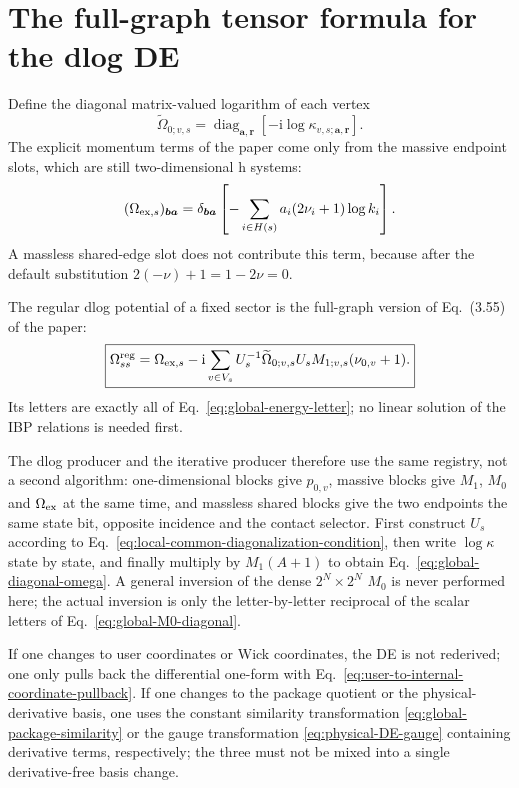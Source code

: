 \documentclass[11pt,a4paper]{article}
\newcommand{\ii}{\mathrm i}
\begin{document}
\section{The full-graph tensor formula for the dlog DE}

Define the diagonal matrix-valued logarithm of each vertex
\begin{equation}
 \widetilde\Omega_{0;v,s}
 =\operatorname{diag}_{\bm a,\bm r}
 \left[-\ii\log\kappa_{v,s;\bm a,\bm r}\right].
 \label{eq:global-omega0}
\end{equation}
The explicit momentum terms of the paper come only from the massive endpoint slots, which are still two-dimensional h systems:
\begin{equation}
 (\Omega_{{\rm ex},s})_{\bm b\bm a}
 =\delta_{\bm b\bm a}
 \left[-\sum_{i\in H(s)}a_i(2\nu_i+1)\log k_i\right].
 \label{eq:global-omega-ex}
\end{equation}
A massless shared-edge slot does not contribute this term, because after the default substitution $2(-\nu)+1=1-2\nu=0$.

The regular dlog potential of a fixed sector is the full-graph version of Eq.~(3.55) of the paper:
\begin{equation}
 \boxed{
 \Omega_{ss}^{\rm reg}
 =\Omega_{{\rm ex},s}
 -\ii\sum_{v\in V_s}
 U_s^{-1}\widetilde\Omega_{0;v,s}U_s
 M_{1;v,s}(\nu_{0,v}+1).
 }
 \label{eq:global-diagonal-omega}
\end{equation}
Its letters are exactly all of Eq.~\eqref{eq:global-energy-letter}; no linear solution of the IBP relations is needed first.

The dlog producer and the iterative producer therefore use the same registry, not a second algorithm: one-dimensional blocks give $p_{0,v}$, massive blocks give $M_1$, $M_0$ and $\Omega_{\rm ex}$ at the same time, and massless shared blocks give the two endpoints the same state bit, opposite incidence and the contact selector. First construct $U_s$ according to Eq.~\eqref{eq:local-common-diagonalization-condition}, then write $\log\kappa$ state by state, and finally multiply by $M_1(A+1)$ to obtain Eq.~\eqref{eq:global-diagonal-omega}. A general inversion of the dense $2^N\times2^N$ $M_0$ is never performed here; the actual inversion is only the letter-by-letter reciprocal of the scalar letters of Eq.~\eqref{eq:global-M0-diagonal}.

If one changes to user coordinates or Wick coordinates, the DE is not rederived; one only pulls back the differential one-form with Eq.~\eqref{eq:user-to-internal-coordinate-pullback}. If one changes to the package quotient or the physical-derivative basis, one uses the constant similarity transformation \eqref{eq:global-package-similarity} or the gauge transformation \eqref{eq:physical-DE-gauge} containing derivative terms, respectively; the three must not be mixed into a single derivative-free basis change.
\end{document}
